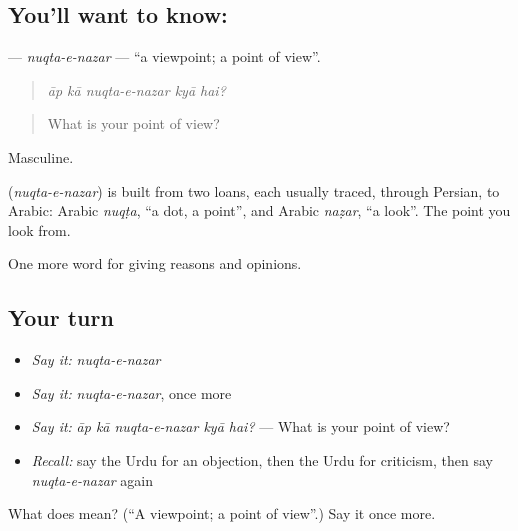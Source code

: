 \subsection*{You'll want to know:  }
\textbf{ } — \emph{nuqta-e-nazar} — \textquotedblleft{}a viewpoint; a point of view\textquotedblright{}.

\begin{quote}
     
\end{quote}

\begin{quote}
\emph{āp kā nuqta-e-nazar kyā hai?}
\end{quote}

\begin{quote}
What is your point of view?
\end{quote}

Masculine.

\begin{cousinweb}
\textbf{ } (\emph{nuqta-e-nazar}) is built from two loans, each usually traced, through Persian, to Arabic: Arabic \emph{nuqṭa}, \textquotedblleft{}a dot, a point\textquotedblright{}, and Arabic \emph{naẓar}, \textquotedblleft{}a look\textquotedblright{}. The point you look from.
\end{cousinweb}

\begin{grammarlens}[title={What you've built}]
One more word for giving reasons and opinions.
\end{grammarlens}

\subsection*{Your turn}
\begin{itemize}
\raggedright
  \item \emph{Say it:} \emph{nuqta-e-nazar}
  \item \emph{Say it:} \emph{nuqta-e-nazar}, once more
  \item \emph{Say it:} \emph{āp kā nuqta-e-nazar kyā hai?} — What is your point of view?
  \item \emph{Recall:} say the Urdu for an objection, then the Urdu for criticism, then say \emph{nuqta-e-nazar} again
\end{itemize}

\begin{tcolorbox}[breakable,colback=teal!4,colframe=teal!35!black,title={Before you move on}]
What does   mean? (\textquotedblleft{}A viewpoint; a point of view\textquotedblright{}.) Say it once more.
\end{tcolorbox}
